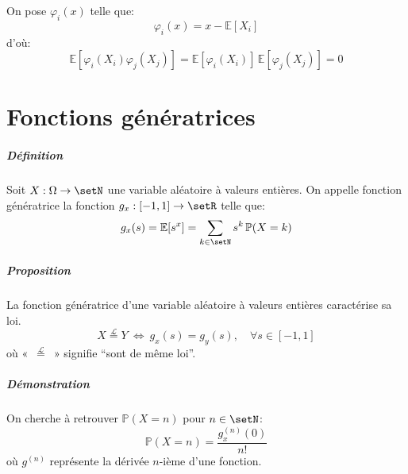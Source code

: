 \documentclass[a4paper,10pt,french,openany]{memoir}
\newcommand{\Proba}{\mathbb{P}}
\newcommand{\Esper}{\mathbb{E}}
\newcommand{\laweq}{\overset{\mathcal L}=}
\begin{document}
On pose $\varphi_i(x)$ telle que:
\[\varphi_i(x) = x - \Esper[X_i]\]
d'où:
\[\Esper[\varphi_i(X_i) \varphi_j(X_j)] = \Esper[\varphi_i(X_i)] \, \Esper[\varphi_j(X_j)] = 0\]

\chapter{Fonctions génératrices}

\paragraph{Définition}
Soit $X: \Omega \rightarrow \setN$ une variable aléatoire à valeurs entières. On appelle fonction génératrice la fonction $g_x:[-1,1]\rightarrow\setR$ telle que:
\[g_x(s)=\Esper[s^x]=\sum_{k\in \setN} s^k\,\Proba(X=k)\]

\paragraph{Proposition}
La fonction génératrice d'une variable aléatoire à valeurs entières caractérise sa loi.
\[ X \laweq Y \:\Leftrightarrow\: g_x(s)=g_y(s), \quad\forall s\in [-1,1] \]
où «~$\laweq$~» signifie ``sont de même loi''.

\paragraph{Démonstration}
On cherche à retrouver $\Proba(X=n)$ pour $n\in \setN$:
\[ \Proba(X=n)=\frac{g_x^{(n)}(0)}{n!} \]
où $g^{(n)}$ représente la dérivée $n$-ième d'une fonction.
\end{document}
